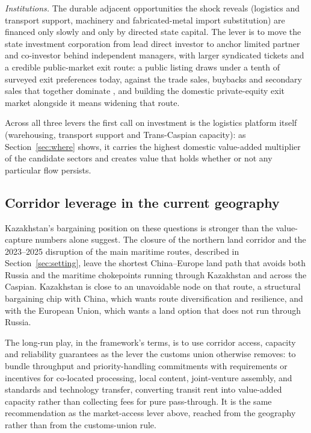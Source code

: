 \documentclass[12pt]{article}
\begin{document}
\emph{Institutions.} The durable adjacent opportunities the shock reveals (logistics and
transport support, machinery and fabricated-metal import substitution) are financed only
slowly and only by directed state capital. The lever is to move the state investment
corporation from lead direct investor to anchor limited partner and co-investor behind
independent managers, with larger syndicated tickets and a credible public-market exit route:
a public listing draws under a tenth of surveyed exit preferences today, against the trade
sales, buybacks and secondary sales that together dominate \citep{qicaifcifc2026pe}, and
building the domestic private-equity exit market alongside it means widening that route.

Across all three levers the first call on investment is the logistics platform itself
(warehousing, transport support and Trans-Caspian capacity): as Section~\ref{sec:where} shows,
it carries the highest domestic value-added multiplier of the candidate sectors and creates
value that holds whether or not any particular flow persists.

\subsection{Corridor leverage in the current geography}

Kazakhstan's bargaining position on these questions is stronger than the value-capture numbers
alone suggest. The closure of the northern land corridor and the 2023--2025 disruption of the
main maritime routes, described in Section~\ref{sec:setting}, leave the shortest China--Europe
land path that avoids both Russia and the maritime chokepoints running through Kazakhstan and
across the Caspian. Kazakhstan is close to an unavoidable node on that route, a structural
bargaining chip with China, which wants route diversification and resilience, and with the
European Union, which wants a land option that does not run through Russia.

The long-run play, in the framework's terms, is to use corridor access, capacity and
reliability guarantees as the lever the customs union otherwise removes: to bundle throughput
and priority-handling commitments with requirements or incentives for co-located processing,
local content, joint-venture assembly, and standards and technology transfer, converting
transit rent into value-added capacity rather than collecting fees for pure pass-through. It
is the same recommendation as the market-access lever above, reached from the geography rather
than from the customs-union rule.
\end{document}
